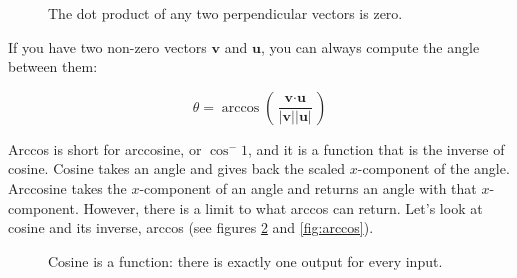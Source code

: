 \begin{figure}[htbp]
    \centering
    \caption{The dot product of any two perpendicular vectors is zero.}
    \label{fig:perpendicular}
\end{figure}
If you have two non-zero vectors $\textbf{v}$ and $\textbf{u}$, you can always 
compute the angle between them:

$$\theta = \arccos{ \left( \frac{\textbf{v} \cdot \textbf{u}}{|\textbf{v}| 
|\textbf{u}|} \right)}$$

Arccos is short for arccosine, or $\cos^-1$, and it is a function that is the 
inverse of cosine. Cosine takes an angle and gives back the scaled 
$x$-component of the angle. Arccosine takes the $x$-component of an angle and 
returns an angle with that $x$-component. However, there is a limit to what 
arccos can return. Let's look at cosine and its inverse, arccos (see figures 
\ref{fig:cosine} and \ref{fig:arccos}). 

\begin{figure}[htbp]
    \centering
        \caption{Cosine is a function: there is exactly one output for every 
        input.}
    \label{fig:cosine}
\end{figure}

